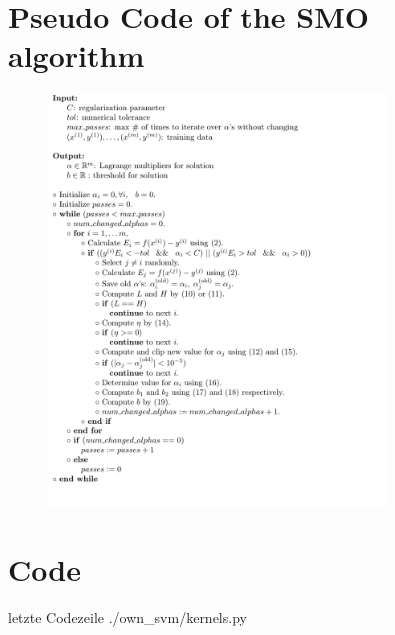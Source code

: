 \section{Pseudo Code of the SMO algorithm}
\begin{figure}[!h]
  \centering
    \includegraphics[width=0.8\textwidth]{media_saved/pseudo_code}
  \label{fig:gull}
\end{figure}

\section{Code}
 letzte Codezeile
{./own_svm/kernels.py}

\printbibliography %
        
